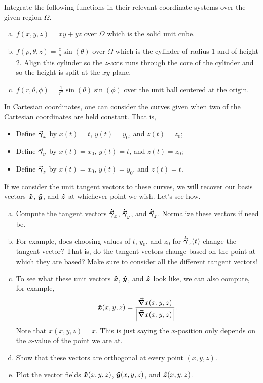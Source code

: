 \documentclass[12pt]{article} %
\begin{document}
\vspace*{1cm}
\begin{problem}
Integrate the following functions in their relevant coordinate systems over the given region $\Omega$.
\begin{enumerate}[(a)]
    \item $f(x,y,z) = xy+yz$ over $\Omega$ which is the solid unit cube.
    \item $f(\rho,\theta,z) = \frac{z}{\rho}\sin(\theta)$ over $\Omega$ which is the cylinder of radius $1$ and of height $2$. Align this cylinder so the $z$-axis runs through the core of the cylinder and so the height is split at the $xy$-plane.
    \item $f(r,\theta,\phi) = \frac{1}{r^2}\sin(\theta)\sin(\phi)$ over the unit ball centered at the origin.
\end{enumerate}
\end{problem}

\vspace*{1cm}
\begin{problem}
In Cartesian coordinates, one can consider the curves given when two of the Cartesian coordinates are held constant. That is,
\begin{itemize}
    \item Define $\boldsymbol{\vec{\gamma}}_x$ by $x(t)=t$, $y(t)=y_0$, and $z(t)=z_0$;
    \item Define $\boldsymbol{\vec{\gamma}}_y$ by $x(t)=x_0$, $y(t)=t$, and $z(t)=z_0$;
    \item Define $\boldsymbol{\vec{\gamma}}_z$ by $x(t)=x_0$, $y(t)=y_0$, and $z(t)=t$.
\end{itemize}
If we consider the unit tangent vectors to these curves, we will recover our basis vectors $\boldsymbol{\hat{x}}$, $\boldsymbol{\hat{y}}$, and $\boldsymbol{\hat{z}}$ at whichever point we wish.  Let's see how.
\begin{enumerate}[(a)]
    \item Compute the tangent vectors $\boldsymbol{\dot{\vec{\gamma}}}_x$, $\boldsymbol{\dot{\vec{\gamma}}}_y$, and $\boldsymbol{\dot{\vec{\gamma}}}_z$.  Normalize these vectors if need be.
    \item For example, does choosing values of $t$, $y_0$, and $z_0$ for $\boldsymbol{\dot{\vec{\gamma}}}_x(t)$ change the tangent vector? That is, do the tangent vectors change based on the point at which they are based? Make sure to consider all the different tangent vectors!
    \item To see what these unit vectors $\boldsymbol{\hat{x}}$, $\boldsymbol{\hat{y}}$, and $\boldsymbol{\hat{z}}$ look like, we can also compute, for example,
        \[
        \boldsymbol{\hat{x}}(x,y,z) = \frac{\boldsymbol{\vec{\nabla}} x(x,y,z)}{\left| \boldsymbol{\vec{\nabla}} x(x,y,z)\right|}.
        \]
        Note that $x(x,y,z)=x$. This is just saying the $x$-position only depends on the $x$-value of the point we are at.
    \item Show that these vectors are orthogonal at every point $(x,y,z)$.
    \item Plot the vector fields $\boldsymbol{\hat{x}}(x,y,z)$, $\boldsymbol{\hat{y}}(x,y,z)$, and $\boldsymbol{\hat{z}}(x,y,z)$.
\end{enumerate}
\end{problem}
\end{document}
